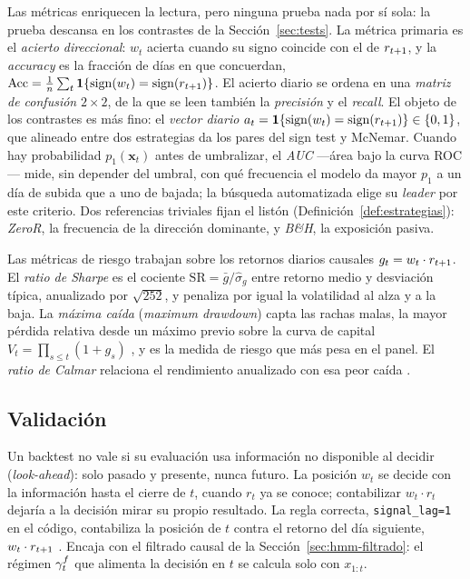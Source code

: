 Las métricas enriquecen la lectura, pero ninguna prueba nada por sí sola: la prueba descansa en los contrastes de la Sección~\ref{sec:tests}. La métrica primaria es el \emph{acierto direccional}: $w_t$ acierta cuando su signo coincide con el de $r_{t+1}$, y la \emph{accuracy} es la fracción de días en que concuerdan, $\mathrm{Acc} = \tfrac{1}{n}\sum_t \mathbf{1}\{\operatorname{sign}(w_t) = \operatorname{sign}(r_{t+1})\}$. El acierto diario se ordena en una \emph{matriz de confusión} $2\times 2$, de la que se leen también la \emph{precisión} y el \emph{recall}. El objeto de los contrastes es más fino: el \emph{vector diario} $a_t = \mathbf{1}\{\operatorname{sign}(w_t) = \operatorname{sign}(r_{t+1})\} \in \{0,1\}$, que alineado entre dos estrategias da los pares del sign test y McNemar. Cuando hay probabilidad $p_1(\mathbf{x}_t)$ antes de umbralizar, el \emph{AUC} —área bajo la curva ROC \cite{hanley1982, fawcett2006}— mide, sin depender del umbral, con qué frecuencia el modelo da mayor $p_1$ a un día de subida que a uno de bajada; la búsqueda automatizada elige su \emph{leader} por este criterio. Dos referencias triviales fijan el listón (Definición~\ref{def:estrategias}): \emph{ZeroR}, la frecuencia de la dirección dominante, y \emph{B\&H}, la exposición pasiva.

Las métricas de riesgo trabajan sobre los retornos diarios causales $g_t = w_t \cdot r_{t+1}$. El \emph{ratio de Sharpe} \cite{sharpe1966, sharpe1994} es el cociente $\mathrm{SR} = \bar{g}/\hat{\sigma}_g$ entre retorno medio y desviación típica, anualizado por $\sqrt{252}$, y penaliza por igual la volatilidad al alza y a la baja. La \emph{máxima caída} (\emph{maximum drawdown}) capta las rachas malas, la mayor pérdida relativa desde un máximo previo sobre la curva de capital $V_t = \prod_{s \le t}(1 + g_s)$ \cite{magdonismail2004}, y es la medida de riesgo que más pesa en el panel. El \emph{ratio de Calmar} relaciona el rendimiento anualizado con esa peor caída \cite{young1991}.

\subsection{Validación}
\label{sec:cpcv}
\label{sec:cpcv-causalidad}
\label{sec:cpcv-walkforward}
\label{sec:cpcv-purga}
\label{sec:cpcv-cpcv}
\label{sec:cpcv-pooled}

Un backtest no vale si su evaluación usa información no disponible al decidir (\emph{look-ahead}): solo pasado y presente, nunca futuro. La posición $w_t$ se decide con la información hasta el cierre de $t$, cuando $r_t$ ya se conoce; contabilizar $w_t \cdot r_t$ dejaría a la decisión mirar su propio resultado. La regla correcta, \texttt{signal\_lag=1} en el código, contabiliza la posición de $t$ contra el retorno del día siguiente, $w_t \cdot r_{t+1}$ \cite{lopezdeprado2018}. Encaja con el filtrado causal de la Sección~\ref{sec:hmm-filtrado}: el régimen $\gamma^{f}_t$ que alimenta la decisión en $t$ se calcula solo con $x_{1:t}$.


